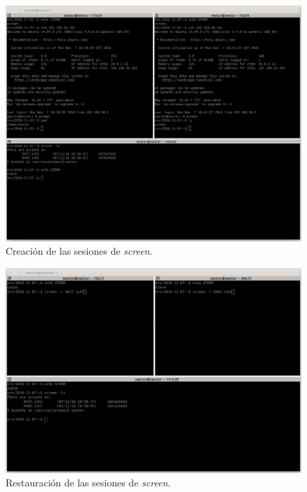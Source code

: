 \documentclass[a4paper,titlepage,12pt]{scrartcl}	%
\numberwithin{figure}{section} %
\numberwithin{table}{section} %
\begin{document}
	\begin{figure}[H]
		\centering
		\includegraphics[scale=0.29]{./Imagenes/O1-1.png}
		\caption[Creación de las sesiones de \textit{screen}.]{Creación de las sesiones de \textit{screen}.}
		\label{O1-1}
	\end{figure}
	
	\begin{figure}[H]
		\centering
		\includegraphics[scale=0.32]{./Imagenes/O1-2.png}
		\caption[Restauración de las sesiones de \textit{screen}.]{Restauración de las sesiones de \textit{screen}.}
		\label{O1-2}
	\end{figure}
	
\end{document}
